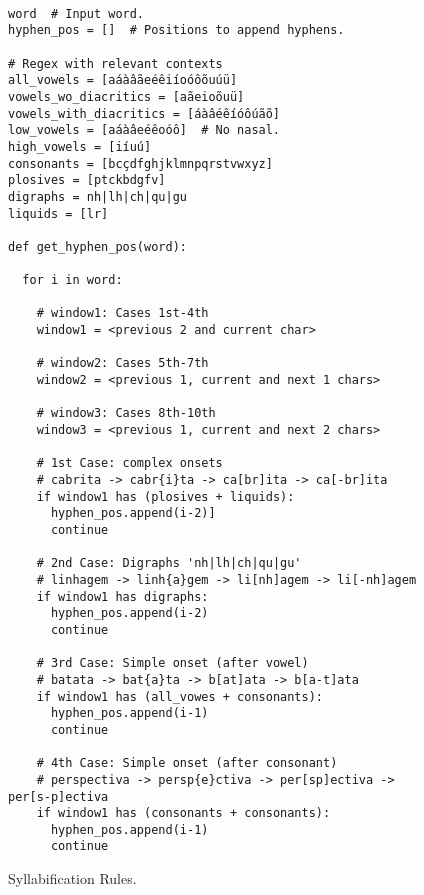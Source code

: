 \begin{figure}[!ht]
  \caption{Syllabification Rules.}
      \label{pseudocode-syll-rules}
\footnotesize

\begin{verbatim}

word  # Input word.
hyphen_pos = []  # Positions to append hyphens.

# Regex with relevant contexts
all_vowels = [aáàâãeéêiíoóôõuúü]
vowels_wo_diacritics = [aãeioõuü]
vowels_with_diacritics = [áàâéêíóôúãõ]
low_vowels = [aáàâeéêoóô]  # No nasal.
high_vowels = [iíuú]
consonants = [bcçdfghjklmnpqrstvwxyz]
plosives = [ptckbdgfv]
digraphs = nh|lh|ch|qu|gu
liquids = [lr]

def get_hyphen_pos(word):

  for i in word:
  
    # window1: Cases 1st-4th
    window1 = <previous 2 and current char>
    
    # window2: Cases 5th-7th
    window2 = <previous 1, current and next 1 chars>
    
    # window3: Cases 8th-10th
    window3 = <previous 1, current and next 2 chars>
    
    # 1st Case: complex onsets
    # cabrita -> cabr{i}ta -> ca[br]ita -> ca[-br]ita 
    if window1 has (plosives + liquids):
      hyphen_pos.append(i-2)]
      continue
    
    # 2nd Case: Digraphs 'nh|lh|ch|qu|gu'
    # linhagem -> linh{a}gem -> li[nh]agem -> li[-nh]agem  
    if window1 has digraphs:
      hyphen_pos.append(i-2)
      continue
      
    # 3rd Case: Simple onset (after vowel)
    # batata -> bat{a}ta -> b[at]ata -> b[a-t]ata
    if window1 has (all_vowes + consonants):
      hyphen_pos.append(i-1)
      continue
    
    # 4th Case: Simple onset (after consonant)
    # perspectiva -> persp{e}ctiva -> per[sp]ectiva -> per[s-p]ectiva
    if window1 has (consonants + consonants):
      hyphen_pos.append(i-1)
      continue

\end{verbatim}
\end{figure}
\clearpage

